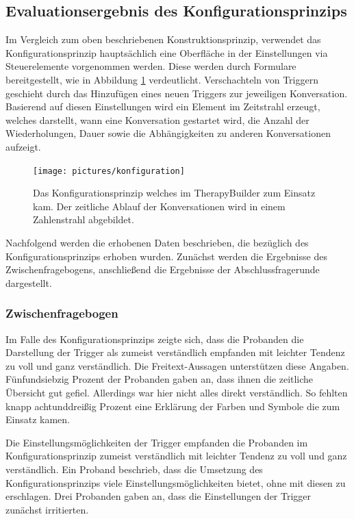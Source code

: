 \subsection{Evaluationsergebnis des Konfigurationsprinzips}
Im Vergleich zum oben beschriebenen Konstruktionsprinzip, verwendet das Konfigurationsprinzip hauptsächlich eine Oberfläche in der Einstellungen via Steuerelemente vorgenommen werden. Diese werden durch Formulare bereitgestellt, wie in Abbildung \ref{konfiguration} verdeutlicht. Verschachteln von Triggern geschieht durch das Hinzufügen eines neuen Triggers zur jeweiligen Konversation. Basierend auf diesen Einstellungen wird ein Element im Zeitstrahl erzeugt, welches darstellt, wann eine Konversation gestartet wird, die Anzahl der Wiederholungen, Dauer sowie die Abhängigkeiten zu anderen Konversationen aufzeigt. 

\begin{figure}[h]
\centering
\texttt{[image: pictures/konfiguration]}
\caption{Das Konfigurationsprinzip welches im TherapyBuilder zum Einsatz kam. Der zeitliche Ablauf der Konversationen wird in einem Zahlenstrahl abgebildet.}
\label{konfiguration}
\end{figure}

Nachfolgend werden die erhobenen Daten beschrieben, die bezüglich des Konfigurationsprinzips erhoben wurden. Zunächst werden die Ergebnisse des Zwischenfragebogens, anschließend die Ergebnisse der Abschlussfragerunde dargestellt.

\subsubsection{Zwischenfragebogen}
Im Falle des Konfigurationsprinzips zeigte sich, dass die Probanden die Darstellung der Trigger als zumeist verständlich empfanden mit leichter Tendenz zu voll und ganz verständlich. Die Freitext-Aussagen unterstützen diese Angaben. Fünfundsiebzig Prozent der Probanden gaben an, dass ihnen die zeitliche Übersicht gut gefiel. Allerdings war hier nicht alles direkt verständlich. So fehlten knapp achtunddreißig Prozent eine Erklärung der Farben und Symbole die zum Einsatz kamen.

Die Einstellungsmöglichkeiten der Trigger empfanden die Probanden im Konfigurationsprinzip zumeist verständlich mit leichter Tendenz zu voll und ganz verständlich. Ein Proband beschrieb, dass die Umsetzung des Konfigurationsprinzips viele Einstellungsmöglichkeiten bietet, ohne mit diesen zu erschlagen. Drei Probanden gaben an, dass die Einstellungen der Trigger zunächst irritierten. 

